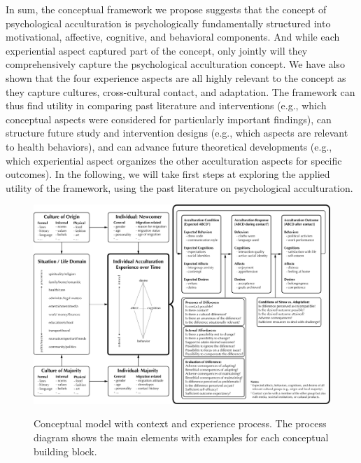\documentclass[man, 12pt, a4paper, mask]{apa7}
\begin{document}
In sum, the conceptual framework we propose suggests that the concept of psychological acculturation is psychologically fundamentally structured into motivational, affective, cognitive, and behavioral components. And while each experiential aspect captured part of the concept, only jointly will they comprehensively capture the psychological acculturation concept. We have also shown that the four experience aspects are all highly relevant to the concept as they capture cultures, cross-cultural contact, and adaptation. The framework can thus find utility in comparing past literature and interventions (e.g., which conceptual aspects were considered for particularly important findings), can structure future study and intervention designs (e.g., which aspects are relevant to health behaviors), and can advance future theoretical developments (e.g., which experiential aspect organizes the other acculturation aspects for specific outcomes). In the following, we will take first steps at exploring the applied utility of the framework, using the past literature on psychological acculturation.


\begin{figure}
    \centering
    \caption{Conceptual model with context and experience process. The process diagram shows the main elements with examples for each conceptual building block.}
    \includegraphics[width=\textwidth]{Figures/ConceptualFrameworkExpandedOptima.pdf}
    \label{fig:ModelContext}
\end{figure}
\end{document}
